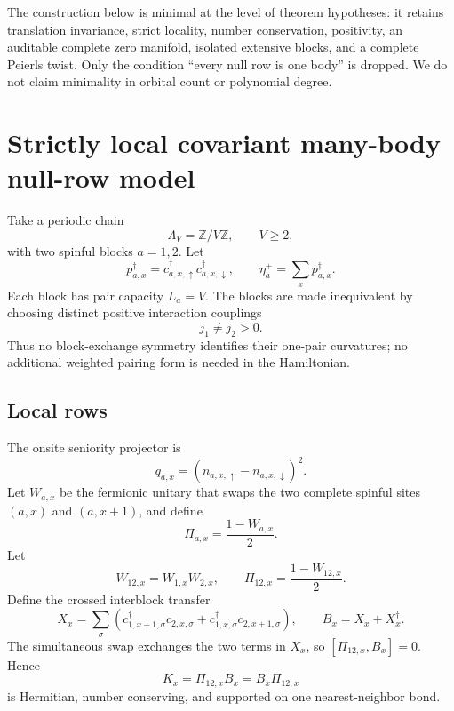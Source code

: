 \documentclass[11pt]{article}
\theoremstyle{remark}
\begin{document}
The construction below is minimal at the level of theorem hypotheses: it
retains translation invariance, strict locality, number conservation,
positivity, an auditable complete zero manifold, isolated extensive blocks,
and a complete Peierls twist.  Only the condition ``every null row is one
body'' is dropped.  We do not claim minimality in orbital count or polynomial
degree.

\section{Strictly local covariant many-body null-row model}

Take a periodic chain
\begin{equation}
 \Lambda_V=\mathbb Z/V\mathbb Z,
 \qquad V\ge2,
\end{equation}
with two spinful blocks $a=1,2$.  Let
\begin{equation}
 p_{a,x}^\dagger
 =c_{a,x,\uparrow}^\dagger c_{a,x,\downarrow}^\dagger,
 \qquad
 \eta_a^+=\sum_xp_{a,x}^\dagger.
 \label{eq:pair-ops}
\end{equation}
Each block has pair capacity $L_a=V$.  The blocks are made inequivalent by
choosing distinct positive interaction couplings
\begin{equation}
 j_1\ne j_2>0.
 \label{eq:distinct-couplings}
\end{equation}
Thus no block-exchange symmetry identifies their one-pair curvatures; no
additional weighted pairing form is needed in the Hamiltonian.

\subsection{Local rows}

The onsite seniority projector is
\begin{equation}
 q_{a,x}=(n_{a,x,\uparrow}-n_{a,x,\downarrow})^2.
 \label{eq:q-row}
\end{equation}
Let $W_{a,x}$ be the fermionic unitary that swaps the two complete spinful
sites $(a,x)$ and $(a,x+1)$, and define
\begin{equation}
 \Pi_{a,x}=\frac{1-W_{a,x}}2.
 \label{eq:swap-projector}
\end{equation}
Let
\begin{equation}
 W_{12,x}=W_{1,x}W_{2,x},
 \qquad
 \Pi_{12,x}=\frac{1-W_{12,x}}2.
 \label{eq:sim-swap}
\end{equation}
Define the crossed interblock transfer
\begin{equation}
 X_x=\sum_\sigma
 \left(
 c_{1,x+1,\sigma}^\dagger c_{2,x,\sigma}
 +c_{1,x,\sigma}^\dagger c_{2,x+1,\sigma}
 \right),
 \qquad
 B_x=X_x+X_x^\dagger.
 \label{eq:B-cross}
\end{equation}
The simultaneous swap exchanges the two terms in $X_x$, so
$[\Pi_{12,x},B_x]=0$.  Hence
\begin{equation}
 K_x=\Pi_{12,x}B_x=B_x\Pi_{12,x}
 \label{eq:K-row}
\end{equation}
is Hermitian, number conserving, and supported on one nearest-neighbor bond.
\end{document}
